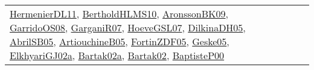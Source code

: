 {\begin{longtable}{lp{3cm}>{\raggedright}p{6cm}>{\raggedright}p{6cm}p{8cm}}
\href{papers/HermenierDL11.pdf}{HermenierDL11}\cite{HermenierDL11}, \href{papers/BertholdHLMS10.pdf}{BertholdHLMS10}\cite{BertholdHLMS10}, \href{papers/AronssonBK09.pdf}{AronssonBK09}\cite{AronssonBK09}, \href{articles/GarridoOS08.pdf}{GarridoOS08}\cite{GarridoOS08}, \href{papers/GarganiR07.pdf}{GarganiR07}\cite{GarganiR07}, \href{papers/HoeveGSL07.pdf}{HoeveGSL07}\cite{HoeveGSL07}, \href{papers/DilkinaDH05.pdf}{DilkinaDH05}\cite{DilkinaDH05}, \href{papers/AbrilSB05.pdf}{AbrilSB05}\cite{AbrilSB05}, \href{papers/ArtiouchineB05.pdf}{ArtiouchineB05}\cite{ArtiouchineB05}, \href{papers/FortinZDF05.pdf}{FortinZDF05}\cite{FortinZDF05}, \href{papers/Geske05.pdf}{Geske05}\cite{Geske05}, \href{papers/ElkhyariGJ02a.pdf}{ElkhyariGJ02a}\cite{ElkhyariGJ02a}, \href{papers/Bartak02a.pdf}{Bartak02a}\cite{Bartak02a}, \href{papers/Bartak02.pdf}{Bartak02}\cite{Bartak02}, \href{articles/BaptisteP00.pdf}{BaptisteP00}\cite{BaptisteP00}\\

\end{longtable}}
